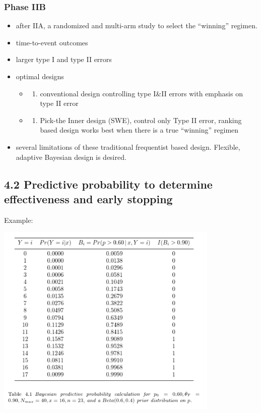 \documentclass[
]{article}
\providecommand{\tightlist}{%
  \setlength{\itemsep}{0pt}\setlength{\parskip}{0pt}}
\begin{document}
\hypertarget{phase-iib}{%
\subsubsection{Phase IIB}\label{phase-iib}}

\begin{itemize}
\tightlist
\item
  after IIA, a randomized and multi-arm study to select the ``winning''
  regimen.
\item
  time-to-event outcomes
\item
  larger type I and type II errors
\item
  optimal designs

  \begin{itemize}
  \item
    \begin{enumerate}
    \def\labelenumi{\alph{enumi})}
    \tightlist
    \item
      conventional design controlling type I\&II errors with emphasis on
      type II error
    \end{enumerate}
  \item
    \begin{enumerate}
    \def\labelenumi{\alph{enumi})}
    \setcounter{enumi}{1}
    \tightlist
    \item
      Pick-the Inner design (SWE), control only Type II error, ranking
      based design works best when there is a true ``winning'' regimen
    \end{enumerate}
  \end{itemize}
\item
  several limitations of these traditional frequentist based design.
  Flexible, adaptive Bayesian design is desired.
\end{itemize}

\hypertarget{predictive-probability-to-determine-effectiveness-and-early-stopping}{%
\subsection{4.2 Predictive probability to determine effectiveness and
early
stopping}\label{predictive-probability-to-determine-effectiveness-and-early-stopping}}

Example:

\includegraphics[width=0.8\textwidth,height=\textheight]{Table4.1.PNG}
\end{document}

